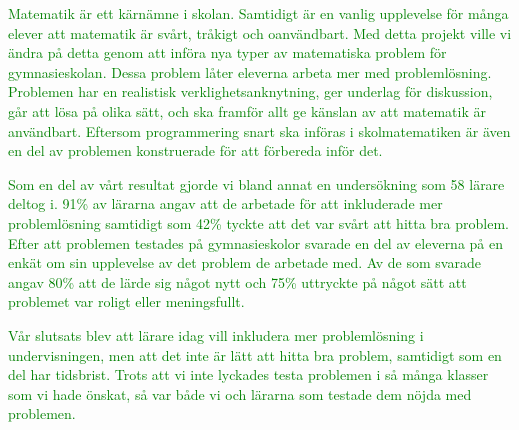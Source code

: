 \noindent \textcolor{green}{Matematik är ett kärnämne i skolan. Samtidigt är en vanlig upplevelse för många elever att matematik är svårt, tråkigt och oanvändbart. Med detta projekt ville vi ändra på detta genom att införa nya typer av matematiska problem för gymnasieskolan. Dessa problem låter eleverna arbeta mer med problemlösning. Problemen har en realistisk verklighetsanknytning, ger underlag för diskussion, går att lösa på olika sätt, och ska framför allt ge känslan av att matematik är användbart. Eftersom programmering snart ska införas i skolmatematiken är även en del av problemen konstruerade för att förbereda inför det.}

\textcolor{green}{Som en del av vårt resultat gjorde vi bland annat en undersökning som 58 lärare deltog i. 91\% av lärarna angav att de arbetade för att inkluderade mer problemlösning samtidigt som 42\% tyckte att det var svårt att hitta bra problem. Efter att problemen testades på gymnasieskolor svarade en del av eleverna på en enkät om sin upplevelse av det problem de arbetade med. Av de som svarade angav 80\% att de lärde sig något nytt och 75\% uttryckte på något sätt att problemet var roligt eller meningsfullt.}

\textcolor{green}{Vår slutsats blev att lärare idag vill inkludera mer problemlösning i undervisningen, men att det inte är lätt att hitta bra problem, samtidigt som en del har tidsbrist. Trots att vi inte lyckades testa problemen i så många klasser som vi hade önskat, så var både vi och lärarna som testade dem nöjda med problemen.}